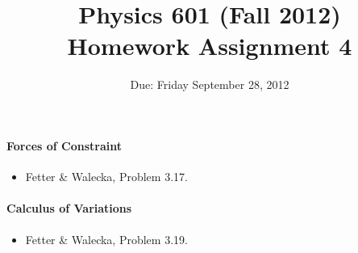 \documentclass[letterpaper,11pt]{article}
\title{Physics 601 (Fall 2012) \\ Homework Assignment 4}
\date{Due: Friday September 28, 2012}
\begin{document}
\maketitle

\paragraph*{Forces of Constraint}
\begin{itemize}
 \item Fetter \& Walecka, Problem 3.17.
\end{itemize}

\paragraph*{Calculus of Variations}
\begin{itemize}
 \item Fetter \& Walecka, Problem 3.19.
\end{itemize}
\end{document}
